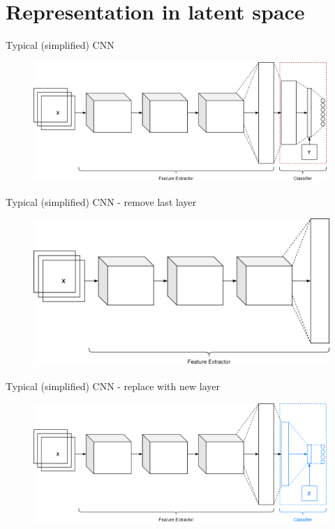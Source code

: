 \section{Representation in latent space}
\begin{frame}{Typical (simplified) CNN}
	\begin{center}
		\begin{figure}
			\includegraphics[width=1\textwidth]{figures/deep_cnn_transfer_learning_1}
		\end{figure}
	\end{center}
\end{frame}
\begin{frame}{Typical (simplified) CNN - remove last layer}
	\begin{center}
		\begin{figure}
			\includegraphics[width=1\textwidth]{figures/deep_cnn_transfer_learning_2}
		\end{figure}
	\end{center}
\end{frame}
\begin{frame}{Typical (simplified) CNN - replace with new layer}
	\begin{center}
		\begin{figure}
			\includegraphics[width=1\textwidth]{figures/deep_cnn_transfer_learning_3}
		\end{figure}
	\end{center}
\end{frame}
